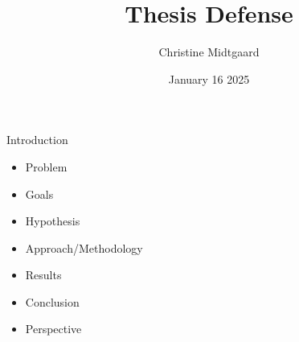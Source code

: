 \documentclass{beamer}
\title{Thesis Defense}
\author{Christine Midtgaard}
\date{January 16 2025}
\begin{document}
\maketitle

\begin{frame}{Introduction}
    \begin{itemize}
        \item<1-> Problem
        \item<2-> Goals
        \item<3-> Hypothesis
        \item<4-> Approach/Methodology
        \item<5-> Results 
        \item<6-> Conclusion
        \item<7-> Perspective 
    \end{itemize}
    
\end{frame}
\end{document}
